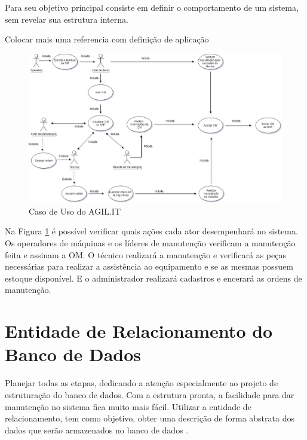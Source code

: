 {{{			Para \cite{carniello2003} seu objetivo principal consiste em definir o comportamento de um sistema, sem revelar sua estrutura interna.}
		
		{\color{red} Colocar mais uma referencia com definição de aplicação}
		
		\begin{figure}[htb]
			\caption{\label{caso_uso}Caso de Uso do AGIL.IT}
			\begin{center}
				\includegraphics[scale=0.50]{./Figuras/caso-uso.png}
			\end{center}
		\end{figure}
		
		Na Figura \ref{caso_uso} é possível verificar quais ações cada ator desempenhará no sistema. Os operadores de máquinas e os líderes de manutenção verificam a manutenção feita e assinam a OM. O técnico realizará a manutenção e verificará as peças necessárias para realizar a assistência ao equipamento e se as mesmas possuem estoque disponível. E o administrador realizará cadastros e encerará as ordens de manutenção.
		
		
		\section{Entidade de Relacionamento do Banco de Dados}
		
		{Planejar todas as etapas, dedicando a atenção especialmente ao projeto de estruturação do banco de dados. Com a estrutura pronta, a facilidade para dar manutenção no sistema fica muito mais fácil.
			Utilizar a entidade de relacionamento, tem como objetivo, obter uma descrição de forma abstrata dos dados que serão armazenados no banco de dados \cite{2010_erbd}. }
		
}}

